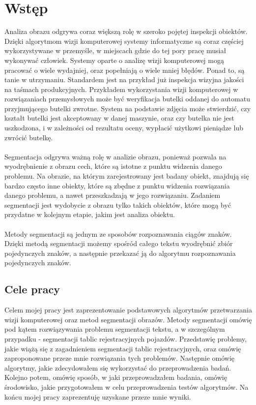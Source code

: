 \section{Wstęp}
Analiza obrazu odgrywa coraz większą rolę w szeroko pojętej inspekcji obiektów. Dzięki algorytmom wizji komputerowej systemy informatyczne są coraz częściej wykorzystywane w przemyśle, w miejscach gdzie do tej pory pracę musiał wykonywać człowiek. Systemy oparte o analizę wizji komputerowej mogą pracować o wiele wydajniej, oraz popełniają o wiele mniej błędów. Ponad to, są tanie w utrzymaniu. Standardem jest na przykład już inspekcja wizyjna jakości na taśmach produkcyjnych. Przykładem wykorzystania wizji komputerowej w rozwiązaniach przemysłowych może być weryfikacja butelki oddanej do automatu przyjmującego butelki zwrotne. System na podstawie zdjęcia może stwierdzić, czy kształt butelki jest akceptowany w danej maszynie, oraz czy butelka nie jest uszkodzona, i w zależności od rezultatu oceny, wypłacić użytkowi pieniądze lub zwrócić butelkę.
\paragraph{}
Segmentacja odgrywa ważną rolę w analizie obrazu, ponieważ pozwala na wyodrębnienie z obrazu cech, które są istotne z punktu widzenia danego problemu. Na obrazie, na którym zarejestrowany jest badany obiekt, znajdują się bardzo często inne obiekty, które są zbędne z punktu widzenia rozwiązania danego problemu, a nawet przeszkadzają w jego rozwiązaniu. Zadaniem segmentacji jest wydobycie z obrazu tylko takich obiektów, które mogą być przydatne w kolejnym etapie, jakim jest analiza obiektu.
\paragraph{}
Metody segmentacji są jednym ze sposobów rozpoznawania ciągów znaków. Dzięki metodą segmentacji możemy spośród całego tekstu wyodrębnić zbiór pojedynczych znaków, a następnie przekazać ją do algorytmu rozpoznawania pojedynczych znaków.

\subsection{Cele pracy}
Celem mojej pracy jest zaprezentowanie podstawowych algorytmów przetwarzania wizji komputerowej oraz metod segmentacji obrazów. Metody segmentacji omówię pod kątem rozwiązywania problemu segmentacji tekstu, a w szczególnym przypadku - segmentacji tablic rejestracyjnych pojazdów. Przedstawię problemy, jakie wiążą się z zagadnieniem segmentacji tablic rejestracyjnych, oraz omówię zaproponowane przeze mnie rozwiązania tych problemów. Następnie omówię algorytmy, jakie zdecydowałem się wykorzystać do przeprowadzenia badań. Kolejno potem, omówię sposób, w jaki przeprowadzałem badania, omówię środowisko, jakie przygotowałem w celu przeprowadzenia testów algorytmów. Na końcu mojej pracy zaprezentuję uzyskane przeze mnie wyniki.
